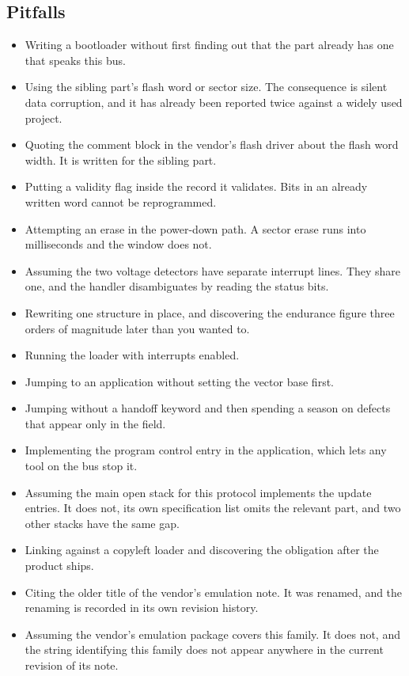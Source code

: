 \subsection*{Pitfalls}

\begin{itemize}
\item Writing a bootloader without first finding out that the part already has
one that speaks this bus.
\item Using the sibling part's flash word or sector size. The consequence is
silent data corruption, and it has already been reported twice against a widely
used project.
\item Quoting the comment block in the vendor's flash driver about the flash
word width. It is written for the sibling part.
\item Putting a validity flag inside the record it validates. Bits in an already
written word cannot be reprogrammed.
\item Attempting an erase in the power-down path. A sector erase runs into
milliseconds and the window does not.
\item Assuming the two voltage detectors have separate interrupt lines. They
share one, and the handler disambiguates by reading the status bits.
\item Rewriting one structure in place, and discovering the endurance figure
three orders of magnitude later than you wanted to.
\item Running the loader with interrupts enabled.
\item Jumping to an application without setting the vector base first.
\item Jumping without a handoff keyword and then spending a season on defects
that appear only in the field.
\item Implementing the program control entry in the application, which lets any
tool on the bus stop it.
\item Assuming the main open stack for this protocol implements the update
entries. It does not, its own specification list omits the relevant part, and two
other stacks have the same gap.
\item Linking against a copyleft loader and discovering the obligation after the
product ships.
\item Citing the older title of the vendor's emulation note. It was renamed, and
the renaming is recorded in its own revision history.
\item Assuming the vendor's emulation package covers this family. It does not,
and the string identifying this family does not appear anywhere in the current
revision of its note.
\end{itemize}

